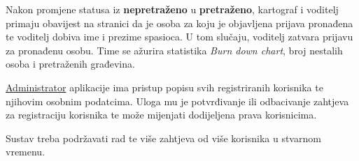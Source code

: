\documentclass{article}
\begin{document}
			Nakon promjene statusa iz \textbf{nepretraženo} u \textbf{pretraženo}, kartograf i voditelj primaju obavijest na stranici da je osoba za koju je objavljena prijava pronađena te voditelj dobiva ime i prezime spasioca. U tom slučaju, voditelj zatvara prijavu za pronađenu osobu. Time se ažurira statistika \textit{Burn down chart}, broj nestalih osoba i pretraženih građevina. 
			
			\underline{Administrator} aplikacije ima pristup popisu svih registriranih korisnika te njihovim osobnim podatcima. Uloga mu je potvrđivanje ili odbacivanje zahtjeva za registraciju korisnika te može mijenjati dodijeljena prava korisnicima.
			
			Sustav treba podržavati rad te više zahtjeva od više korisnika u stvarnom vremenu. 
		
\end{document}
